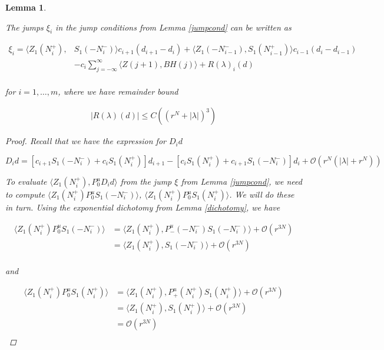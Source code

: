 \documentclass[12pt]{article}
\newtheorem{lemma}{Lemma}
\begin{document}
\begin{lemma}\label{jumpcond2}

The jumps $\xi_i$ in the jump conditions from Lemma \ref{jumpcond} can be written as

\begin{align}\label{jumps}
\xi_i = \langle Z_1(N_i^+), &S_1(-N_i^-) \rangle c_{i+1}( d_{i+1} - d_i) 
+ \langle Z_1(-N_{i-1}^-), S_1(N_{i-1}^+) \rangle c_{i-1}( d_i - d_{i-1}) \\
&- c_i \sum_{j = -\infty}^{\infty} \langle Z(j+1), B H(j)\rangle + R(\lambda)_i(d) \\
\end{align}

for $i = 1, \dots, m$, where we have remainder bound

\begin{align*}
|R(\lambda)(d)| \leq C\left( (r^N + |\lambda|)^3 \right)
\end{align*}

\begin{proof}
Recall that we have the expression for $D_i d$

\[
D_i d = [ c_{i+1} S_1(-N_i^-) + c_i S_1(N_i^+) ] d_{i+1}
- [ c_i S_1(N_i^+) + c_{i+1} S_1(-N_i^-) ] d_i 
+\mathcal{O}(r^N( |\lambda| + r^N))
\]

To evaluate $\langle Z_1(N_i^+), P_0^u D_i d \rangle$ from the jump $\xi$ from Lemma \ref{jumpcond}, we need to compute $\langle Z_1(N_i^+) P_0^u S_1(-N_i^-) \rangle$, $\langle Z_1(N_i^+) P_0^u S_1(N_i^+) \rangle$. We will do these in turn. Using the exponential dichotomy from Lemma \ref{dichotomy}, we have

\begin{align*}
\langle Z_1(N_i^+) P_0^u S_1(-N_i^-) \rangle
&= \langle Z_1(N_i^+), P_-^u(-N_i^-) S_1(-N_i^-) \rangle + \mathcal{O}(r^{3N}) \\
&= \langle Z_1(N_i^+), S_1(-N_i^-) \rangle + \mathcal{O}(r^{3N}) \\
\end{align*}

and

\begin{align*}
\langle Z_1(N_i^+) P_0^u S_1(N_i^+) \rangle
&= \langle Z_1(N_i^+), P_+^u(N_i^+) S_1(N_i^+) \rangle + \mathcal{O}(r^{3N}) \\
&= \langle Z_1(N_i^+), S_1(N_i^+) \rangle + \mathcal{O}(r^{3N}) \\
&= \mathcal{O}(r^{3N}) \\
\end{align*}


\end{proof}
\end{lemma}
\end{document}

